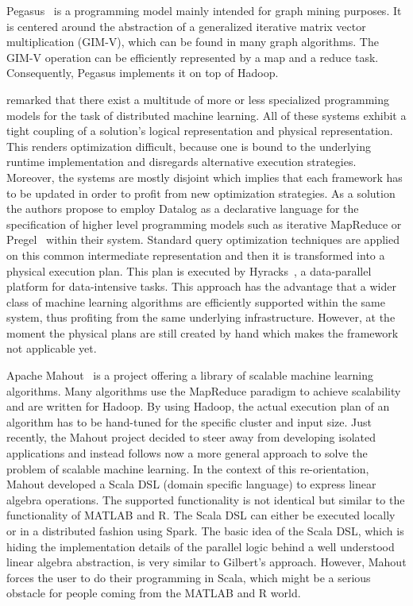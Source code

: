 Pegasus~\cite{kang:2009a} is a programming model mainly intended for graph mining purposes.
It is centered around the abstraction of a generalized iterative matrix vector multiplication (GIM-V), which can be found in many graph algorithms.
The GIM-V operation can be efficiently represented by a map and a reduce task.
Consequently, Pegasus implements it on top of Hadoop.

\Textcite{bu:apa2012a} remarked that there exist a multitude of more or less specialized programming models for the task of distributed machine learning.
All of these systems exhibit a tight coupling of a solution's logical representation and physical representation.
This renders optimization difficult, because one is bound to the underlying runtime implementation and disregards alternative execution strategies.
Moreover, the systems are mostly disjoint which implies that each framework has to be updated in order to profit from new optimization strategies.
As a solution the authors propose to employ Datalog as a declarative language for the specification of higher level programming models such as iterative MapReduce or Pregel~\cite{malewicz:2010a} within their system.
Standard query optimization techniques are applied on this common intermediate representation and then it is transformed into a physical execution plan.
This plan is executed by Hyracks~\cite{borkar:2011a}, a data-parallel platform for data-intensive tasks.
This approach has the advantage that a wider class of machine learning algorithms are efficiently supported within the same system, thus profiting from the same underlying infrastructure.
However, at the moment the physical plans are still created by hand which makes the framework not applicable yet.

Apache Mahout~\cite{mahout:2011a} is a project offering a library of scalable machine learning algorithms.
Many algorithms use the MapReduce paradigm to achieve scalability and are written for Hadoop.
By using Hadoop, the actual execution plan of an algorithm has to be hand-tuned for the specific cluster and input size.
Just recently, the Mahout project decided to steer away from developing isolated applications and instead follows now a more general approach to solve the problem of scalable machine learning.
In the context of this re-orientation, Mahout developed a Scala DSL (domain specific language) to express linear algebra operations.
The supported functionality is not identical but similar to the functionality of MATLAB and R.
The Scala DSL can either be executed locally or in a distributed fashion using Spark.
The basic idea of the Scala DSL, which is hiding the implementation details of the parallel logic behind a well understood linear algebra abstraction, is very similar to Gilbert's approach.
However, Mahout forces the user to do their programming in Scala, which might be a serious obstacle for people coming from the MATLAB and R world. 

